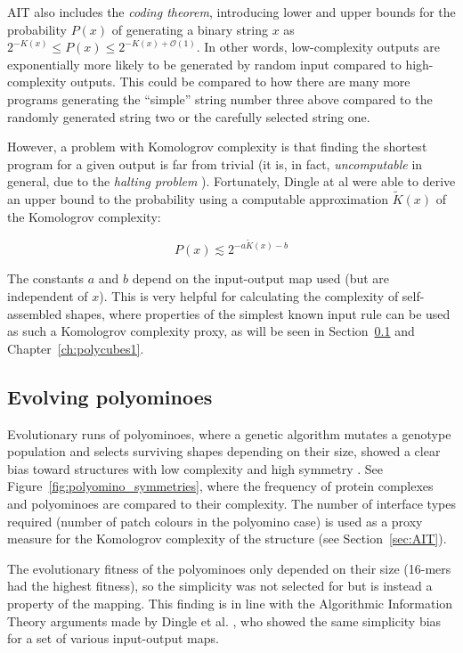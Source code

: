 AIT also includes the \emph{coding theorem}, introducing lower and upper bounds for the probability \(P(x)\) of generating a binary string \(x\) as \(2^{-K(x)} \le P(x) \le 2^{-K(x) + \mathcal{O} (1)}\). In other words, low-complexity outputs are exponentially more likely to be generated by random input compared to high-complexity outputs. This could be compared to how there are many more programs generating the ``simple'' string number three above compared to the randomly generated string two or the carefully selected string one.

However, a problem with Komologrov complexity is that finding the shortest program for a given output is far from trivial (it is, in fact, \emph{uncomputable} in general, due to the \emph{halting problem} \cite{LiMing2019AitK}). Fortunately, Dingle at al \cite{dingle2018input} were able to derive an upper bound to the probability using a computable approximation \(\widetilde{K}(x)\) of the Komologrov complexity:

\[
  P(x) \lesssim 2^{-a\widetilde{K}(x) -b}
\]

The constants \(a\) and \(b\) depend on the input-output map used (but are independent of \(x\)). This is very helpful for calculating the complexity of self-assembled shapes, where properties of the simplest known input rule can be used as such a Komologrov complexity proxy, as will be seen in Section~\ref{sec:polyomino_evolve} and Chapter~\ref{ch:polycubes1}.

\subsection{Evolving polyominoes}
\label{sec:polyomino_evolve}

Evolutionary runs of polyominoes, where a genetic algorithm mutates a genotype population and selects surviving shapes depending on their size, showed a clear bias toward structures with low complexity and high symmetry \cite{johnston2021}. See Figure~\ref{fig:polyomino_symmetries}, where the frequency of protein complexes and polyominoes are compared to their complexity. The number of interface types required (number of patch colours in the polyomino case) is used as a proxy measure for the Komologrov complexity of the structure (see Section~\ref{sec:AIT}).

The evolutionary fitness of the polyominoes only depended on their size (16-mers had the highest fitness), so the simplicity was not selected for but is instead a property of the mapping. This finding is in line with the Algorithmic Information Theory arguments made by Dingle et al. \cite{dingle2018input}, who showed the same simplicity bias for a set of various input-output maps.


